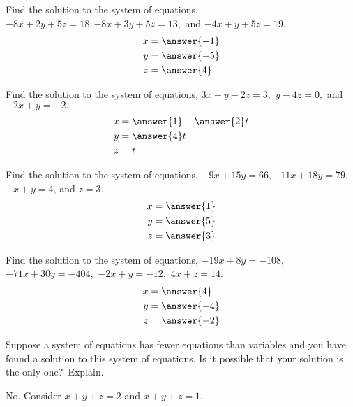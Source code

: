 \documentclass{ximera}
\begin{document}
\begin{problem}\label{prb:2.35} Find the solution to the system of equations,
$-8x+2y+5z=18,-8x+3y+5z=13,$ and $-4x+y+5z=19.$
 \begin{align*}
 x&=\answer{-1}\\
 y&=\answer{-5}\\
 z&=\answer{4}\\
 \end{align*}
\end{problem}

\begin{problem}\label{prb:2.36} Find the solution to the system of equations, $3x-y-2z=3,$
$y-4z=0,$ and $-2x+y=-2.$
 \begin{align*}
 x&=\answer{1}-\answer{2}t\\
 y&=\answer{4}t\\
 z&=t\\
 \end{align*}
\end{problem}

\begin{problem}\label{prb:2.37} Find the solution to the system of equations,
$-9x+15y=66,-11x+18y=79$, $-x+y=4$, and $z=3$.
 \begin{align*}
 x&=\answer{1}\\
 y&=\answer{5}\\
 z&=\answer{3}\\
 \end{align*}
\end{problem}

\begin{problem}\label{prb:2.38} Find the solution to the system of equations, $-19x+8y=-108,$
$-71x+30y=-404,$ $-2x+y=-12,$ $4x+z=14.$
 \begin{align*}
 x&=\answer{4}\\
 y&=\answer{-4}\\
 z&=\answer{-2}\\
 \end{align*}
\end{problem}

\begin{problem}\label{prb:2.39} Suppose a system of equations has fewer equations than variables and
you have found a solution to this system of equations. Is it possible that
your solution is the only one?\ Explain.
\begin{hint}
No. Consider $x+y+z=2$ and $x+y+z=1.$
\end{hint}
\end{problem}
\end{document}
